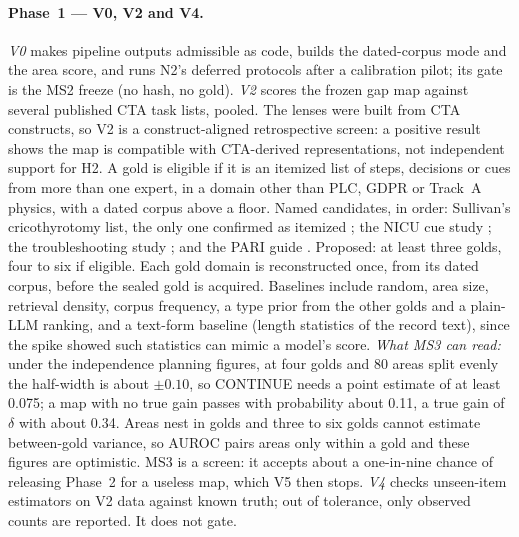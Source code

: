 \paragraph{Phase~1 --- V0, V2 and V4.} \evfut{} \emph{V0} makes pipeline outputs admissible as code,
builds the dated-corpus mode and the area score, and runs N2's deferred protocols after a calibration
pilot; its gate is the MS2 freeze (no hash, no gold). \emph{V2} scores the frozen gap map against
several published CTA task lists, pooled. The lenses were built from CTA constructs, so V2 is a
construct-aligned retrospective screen: a positive result shows the map is compatible with CTA-derived
representations, not independent support for H2. A gold is eligible if it is an itemized list of steps,
decisions or cues from more than one expert, in a domain other than PLC, GDPR or Track~A physics, with
a dated corpus above a floor. Named candidates, in order: Sullivan's cricothyrotomy list, the only one
confirmed as itemized \parencite{sullivan2014use}; the NICU cue study \parencite{crandall1993critical};
the troubleshooting study \parencite{chao1994percentage}; and the PARI guide
\parencite{hall1995procedural}. Proposed: at least three golds, four to six if eligible. Each gold
domain is reconstructed once, from its dated corpus, before the sealed gold is acquired. Baselines
include random, area size, retrieval density, corpus frequency, a type prior from the other golds and a
plain-LLM ranking, and a text-form baseline (length statistics of the record text), since the spike
showed such statistics can mimic a model's score. \emph{What MS3 can read:} under the independence
planning figures, at four golds and 80 areas split evenly the half-width is about $\pm 0.10$, so CONTINUE
needs a point estimate of at least 0.075; a map with no true gain passes with probability about 0.11, a
true gain of $\delta$ with about 0.34. Areas nest in golds and three to six golds cannot estimate
between-gold variance, so AUROC pairs areas only within a gold and these figures are optimistic. \evint{} MS3 is a screen: it
accepts about a one-in-nine chance of releasing Phase~2 for a useless map, which V5 then stops. \emph{V4}
checks unseen-item estimators on V2 data against known truth; out of tolerance, only observed counts are
reported. It does not gate.

